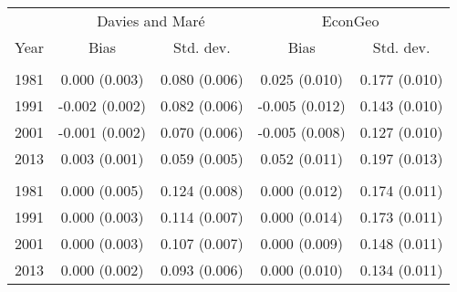 
\begin{tabular}{ccccc}
\toprule
\multicolumn{1}{c}{} & \multicolumn{2}{c}{Davies and Mar\'e} & \multicolumn{2}{c}{EconGeo} \\
\cmidrule(l{3pt}r{3pt}){2-3} \cmidrule(l{3pt}r{3pt}){4-5}
Year & Bias & Std. dev. & Bias & Std. dev.\\
\midrule
\addlinespace[0.3em]
\multicolumn{5}{l}{Population-weighted}\\
\hspace{1em}1981 & 0.000 (0.003) & 0.080 (0.006) & 0.025 (0.010) & 0.177 (0.010)\\
\hspace{1em}1991 & -0.002 (0.002) & 0.082 (0.006) & -0.005 (0.012) & 0.143 (0.010)\\
\hspace{1em}2001 & -0.001 (0.002) & 0.070 (0.006) & -0.005 (0.008) & 0.127 (0.010)\\
\hspace{1em}2013 & 0.003 (0.001) & 0.059 (0.005) & 0.052 (0.011) & 0.197 (0.013)\\
\addlinespace[0.3em]
\multicolumn{5}{l}{Unweighted}\\
\hspace{1em}1981 & 0.000 (0.005) & 0.124 (0.008) & 0.000 (0.012) & 0.174 (0.011)\\
\hspace{1em}1991 & 0.000 (0.003) & 0.114 (0.007) & 0.000 (0.014) & 0.173 (0.011)\\
\hspace{1em}2001 & 0.000 (0.003) & 0.107 (0.007) & 0.000 (0.009) & 0.148 (0.011)\\
\hspace{1em}2013 & 0.000 (0.002) & 0.093 (0.006) & 0.000 (0.010) & 0.134 (0.011)\\
\bottomrule
\end{tabular}
